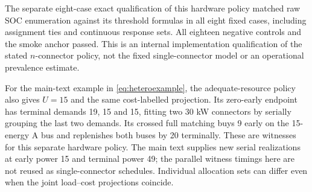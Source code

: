 The separate eight-case exact qualification of this hardware policy matched
raw SOC enumeration against its threshold formulas in all eight fixed cases,
including assignment ties and continuous response sets. All eighteen negative
controls and the smoke anchor passed. This is an internal implementation
qualification of the stated $n$-connector policy, not the fixed single-connector
model or an operational prevalence estimate.

For the main-text example in \eqref{eq:heteroexample}, the adequate-resource
policy also gives $U=15$ and the same cost-labelled projection. Its zero-early
endpoint has terminal demands 19, 15 and 15, fitting two 30 kW connectors by
serially grouping the last two demands. Its crossed full matching buys 9 early
on the 15-energy A bus and replenishes both buses by 20 terminally. These are
witnesses for this separate hardware policy. The main text supplies new serial
realizations at early power 15 and terminal power 49; the parallel witness
timings here are not reused as single-connector schedules. Individual allocation
sets can differ even when the joint load--cost projections coincide.
